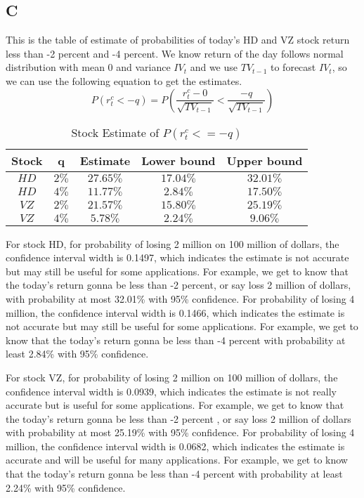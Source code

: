 \documentclass{report}
\begin{document}
\subsection{C}

This is the table of estimate of probabilities of today's HD and VZ stock return less than -2 percent and -4 percent. We know return of the day follows normal distribution with mean 0 and variance $IV_{t}$ and we use $TV_{t-1}$ to forecast $IV_{t}$, so we can use the following equation to get the estimates.
\[ P( r_{t}^{c} < -q ) = P( \frac{r_{t}^{c} - 0}{ \sqrt{TV_{t-1}}} < \frac{ -q }{ \sqrt{TV_{t-1}}} ) \]
\begin{table}[H]
\centering
\begin{tabular}{|c|c|c|c|c|}
\hline
Stock&q&Estimate&Lower bound&Upper bound\\
\hline
$HD$& $2\%$ & $27.65\%$ & $17.04\%$&$32.01\%$\\
\hline
$HD$& $4\%$ & $11.77\%$ & $2.84\%$&$17.50\%$\\
\hline
$VZ$& $2\%$ & $21.57\%$ & $15.80\%$&$25.19\%$\\
\hline
$VZ$& $4\%$ & $5.78\%$ & $2.24\%$&$9.06\%$\\
\hline
\end{tabular}
\caption{ Stock Estimate of $ P( r_{t}^{c} <= -q )$}
\end{table}
For stock HD, for probability of losing 2 million on 100 million of dollars, the confidence interval width is 0.1497, which indicates the estimate is not accurate but may still be useful for some applications. For example, we get to know that the today's return gonna be less than -2 percent, or say loss 2 million of dollars, with probability at most  32.01\% with 95\% confidence. For probability of losing 4 million,  the confidence interval width is 0.1466, which indicates the estimate is not accurate but may still be useful for some applications. For example, we get to know that the today's return gonna be less than -4 percent with probability at least 2.84\% with 95\% confidence. 

For stock VZ, for probability of losing 2 million on 100 million of dollars, the confidence interval width is 0.0939, which indicates the estimate is not really accurate but is useful for some applications. For example, we get to know that the today's return gonna be less than -2 percent , or say loss 2 million of dollars with probability at most  25.19\% with 95\% confidence. For probability of losing 4 million, the confidence interval width is 0.0682, which indicates the estimate is accurate and will be useful for many applications. For example, we get to know that the today's return gonna be less than -4 percent with probability at least 2.24\% with 95\% confidence. 
\end{document}
